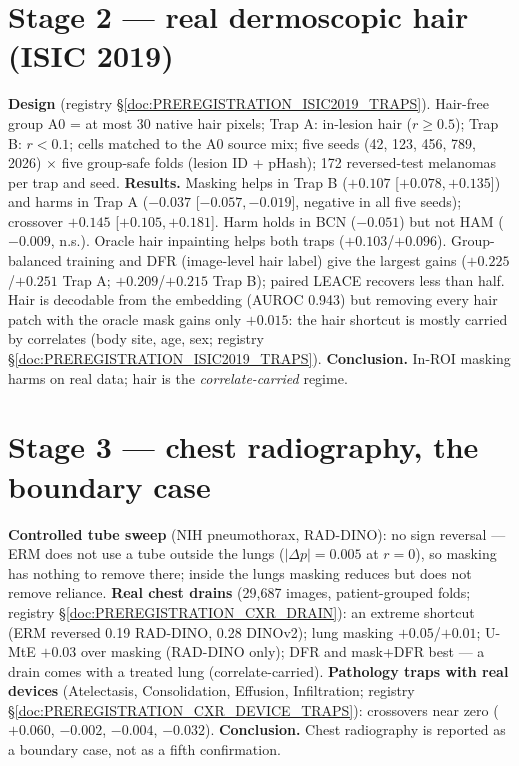 \documentclass[10pt,a4paper]{article}
\begin{document}
\section{Stage 2 --- real dermoscopic hair (ISIC 2019)}
\textbf{Design} (registry \S\ref{doc:PREREGISTRATION_ISIC2019_TRAPS}). Hair-free group A0 = at most 30 native hair pixels;
Trap A: in-lesion hair ($r\ge0.5$); Trap B: $r<0.1$; cells matched to the A0 source mix; five seeds (42, 123, 456, 789,
2026) $\times$ five group-safe folds (lesion ID + pHash); 172 reversed-test melanomas per trap and seed.
\textbf{Results.} Masking helps in Trap B ($+0.107$ [$+0.078,+0.135$]) and harms in Trap A ($-0.037$ [$-0.057,-0.019$],
negative in all five seeds); crossover $+0.145$ [$+0.105,+0.181$]. Harm holds in BCN ($-0.051$) but not HAM ($-0.009$, n.s.).
Oracle hair inpainting helps both traps ($+0.103$/$+0.096$). Group-balanced training and DFR (image-level hair label) give
the largest gains ($+0.225$/$+0.251$ Trap A; $+0.209$/$+0.215$ Trap B); paired LEACE recovers less than half.
Hair is decodable from the embedding (AUROC 0.943) but removing every hair patch with the oracle mask gains only
$+0.015$: the hair shortcut is mostly carried by correlates (body site, age, sex; registry \S\ref{doc:PREREGISTRATION_ISIC2019_TRAPS}).
\textbf{Conclusion.} In-ROI masking harms on real data; hair is the \emph{correlate-carried} regime.

\section{Stage 3 --- chest radiography, the boundary case}
\textbf{Controlled tube sweep} (NIH pneumothorax, RAD-DINO): no sign reversal --- ERM does not use a tube outside the
lungs ($|\Delta p|=0.005$ at $r=0$), so masking has nothing to remove there; inside the lungs masking reduces but does not
remove reliance. \textbf{Real chest drains} (29{,}687 images, patient-grouped folds; registry \S\ref{doc:PREREGISTRATION_CXR_DRAIN}):
an extreme shortcut (ERM reversed 0.19 RAD-DINO, 0.28 DINOv2); lung masking $+0.05$/$+0.01$; U-MtE $+0.03$ over masking
(RAD-DINO only); DFR and mask+DFR best --- a drain comes with a treated lung (correlate-carried). \textbf{Pathology traps with
real devices} (Atelectasis, Consolidation, Effusion, Infiltration; registry \S\ref{doc:PREREGISTRATION_CXR_DEVICE_TRAPS}):
crossovers near zero ($+0.060$, $-0.002$, $-0.004$, $-0.032$). \textbf{Conclusion.} Chest radiography is reported as a boundary
case, not as a fifth confirmation.
\end{document}
